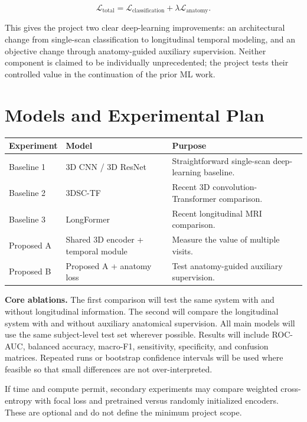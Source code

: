 \documentclass[11pt]{article}
\begin{document}
\[
\mathcal{L}_{\mathrm{total}} = \mathcal{L}_{\mathrm{classification}} + \lambda\mathcal{L}_{\mathrm{anatomy}}.
\]

This gives the project two clear deep-learning improvements: an architectural change from single-scan classification to longitudinal temporal modeling, and an objective change through anatomy-guided auxiliary supervision. Neither component is claimed to be individually unprecedented; the project tests their controlled value in the continuation of the prior ML work.

\section{Models and Experimental Plan}

\begin{center}
\small
\begin{tabularx}{\textwidth}{@{}lYY@{}}
\toprule
\textbf{Experiment} & \textbf{Model} & \textbf{Purpose}\\
\midrule
Baseline 1 & 3D CNN / 3D ResNet & Straightforward single-scan deep-learning baseline.\\
Baseline 2 & 3DSC-TF & Recent 3D convolution-Transformer comparison.\\
Baseline 3 & LongFormer & Recent longitudinal MRI comparison.\\
Proposed A & Shared 3D encoder + temporal module & Measure the value of multiple visits.\\
Proposed B & Proposed A + anatomy loss & Test anatomy-guided auxiliary supervision.\\
\bottomrule
\end{tabularx}
\end{center}

\textbf{Core ablations.} The first comparison will test the same system with and without longitudinal information. The second will compare the longitudinal system with and without auxiliary anatomical supervision. All main models will use the same subject-level test set wherever possible. Results will include ROC-AUC, balanced accuracy, macro-F1, sensitivity, specificity, and confusion matrices. Repeated runs or bootstrap confidence intervals will be used where feasible so that small differences are not over-interpreted.

If time and compute permit, secondary experiments may compare weighted cross-entropy with focal loss and pretrained versus randomly initialized encoders. These are optional and do not define the minimum project scope.
\end{document}

